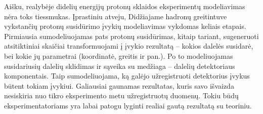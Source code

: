 \documentclass[a4paper, 12pt]{article}
\begin{document}
Aišku, realybėje didelių energijų protonų sklaidos eksperimentų modeliavimas nėra toks
tiessmukas.
Įprastiniu atveju, Didžiajame hadronų greitintuve vykstančių protonų susidūrimo įvykių
modeliavimas vykdomas keliais etapais.
Pirmiausia sumodeliuojamas pats protonų susidūrimas, kitaip tariant, sugeneruoti
atsitiktiniai skaičiai transformuojami į įvykio rezultatą -- kokios dalelės susidarė, bei
kokie jų parametrai (koordinatė, greitis ir pan.).
Po to modeliuojamas susidariusių dalelių sklidimas ir sąveika su medžiaga -- dalelių
detektoriaus komponentais.
Taip sumodeliuojama, ką galėjo užregistruoti detektorius įvykus būtent tokiam įvykiui.
Galiausiai gaunamas rezultatas, kuris savo išvaizda nesiskiria nuo tikro eksperimento metu
užregistruotų duomenų.
Tokiu būdų eksperimentatoriams yra labai patogu lyginti realiai gautą rezultatą su teoriniu.
\end{document}
